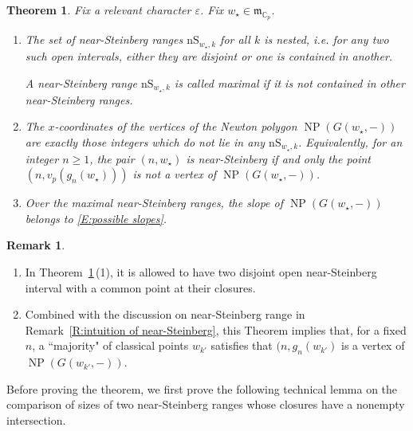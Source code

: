 \documentclass[12pt]{amsart}
\newcommand{\liang}[1]{{\color{blue} \sf $\clubsuit\clubsuit\clubsuit$ Liang: [#1]}}
\newtheorem{theorem}[subsection]{Theorem}
\theoremstyle{definition}
\newtheorem{remark}[subsection]{Remark}
\numberwithin{equation}{subsection}
\def\gothm{\mathfrak{m}}
\def\CC{\mathbb{C}}
\DeclareMathOperator{\NP}{NP}
\newcommand{\nS}{\mathrm{nS}}
\begin{document}
\begin{theorem}
\label{T:near Steinberg = non-vertex}
Fix a relevant character $\varepsilon$.
Fix $w_\star \in \gothm_{\CC_p}$. 

\begin{enumerate}
\item The set of near-Steinberg ranges $\nS_{w_\star, k}$ for all $k$ is nested, i.e. for any two such open intervals, either they are  disjoint or one is contained in another.

A near-Steinberg range $\nS_{w_\star, k}$ is called \emph{maximal} if it is not contained in other near-Steinberg ranges.

\item 

The $x$-coordinates of the vertices of the Newton polygon $\NP(G(w_\star, -))$ are exactly those integers which do not lie in any $\nS_{w_\star, k}$. Equivalently, for an integer $n \geq 1$, the pair $(n, w_\star)$ is near-Steinberg if and only the point $(n, v_p(g_n(w_\star)))$ is not a vertex of $\NP(G(w_\star, -))$.

\item 
Over the maximal near-Steinberg ranges, the slope of $\NP(G(w_\star, -))$ belongs to
\eqref{E:possible slopes}.
\end{enumerate}

\end{theorem}
\begin{remark}
\begin{enumerate}
\item In Theorem~\ref{T:near Steinberg = non-vertex}\,(1), it is allowed to have two disjoint open near-Steinberg interval with a common point at their closures.
\item 
Combined with the discussion on near-Steinberg range in Remark~\ref{R:intuition of near-Steinberg}, this Theorem implies that, for a fixed $n$, a ``majority" of classical points $w_{k'}$ satisfies that $(n, g_n(w_{k'})$ is a vertex of $\NP(G(w_{k'},-))$. 
\end{enumerate}
\end{remark}


Before proving the theorem, we first prove the following technical lemma on the comparison of sizes of two near-Steinberg ranges whose closures have a nonempty intersection.
\end{document}
